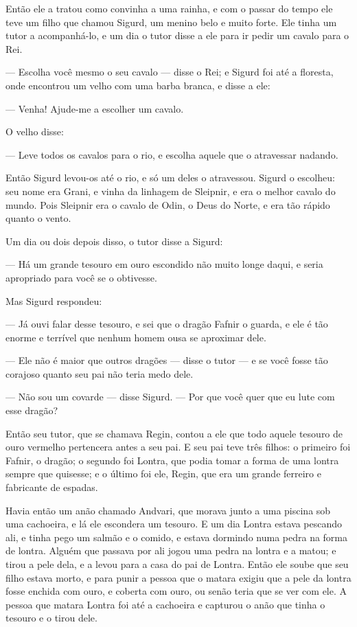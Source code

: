 Então ele a tratou como convinha a uma rainha, e com o passar do tempo
ele teve um filho que chamou Sigurd, um menino belo e muito forte.
Ele tinha um tutor a acompanhá-lo, e um dia o tutor disse a ele para
ir pedir um cavalo para o Rei. 

— Escolha você mesmo o seu cavalo — disse o Rei; e Sigurd foi até a
floresta, onde encontrou um velho com uma barba branca, e disse a
ele:

— Venha! Ajude-me a escolher um cavalo.

O velho disse:

— Leve todos os cavalos para o rio, e escolha aquele que o atravessar
nadando. 

Então Sigurd levou-os até o rio, e só um deles o atravessou. Sigurd o
escolheu: seu nome era Grani, e vinha da linhagem de Sleipnir, e era
o melhor cavalo do mundo. Pois Sleipnir era o cavalo de Odin, o Deus
do Norte, e era tão rápido quanto o vento. 

Um dia ou dois depois disso, o tutor disse a Sigurd:

— Há um grande tesouro em ouro escondido não muito longe daqui, e
seria apropriado para você se o obtivesse. 

Mas Sigurd respondeu:

— Já ouvi falar desse tesouro, e sei que o dragão Fafnir o guarda, e
ele é tão enorme e terrível que nenhum homem ousa se aproximar dele.

— Ele não é maior que outros dragões — disse o tutor — e se você fosse
tão corajoso quanto seu pai não teria medo dele. 

— Não sou um covarde — disse Sigurd. — Por que você quer que eu lute
com esse dragão? 

Então seu tutor, que se chamava Regin, contou a ele que todo aquele
tesouro de ouro vermelho pertencera antes a seu pai. E seu pai teve
três filhos: o primeiro foi Fafnir, o dragão; o segundo foi Lontra,
que podia tomar a forma de uma lontra sempre que quisesse; e o último
foi ele, Regin, que era um grande ferreiro e fabricante de espadas. 

Havia então um anão chamado Andvari, que morava junto a uma piscina
sob uma cachoeira, e lá ele escondera um tesouro. E um dia Lontra
estava pescando ali, e tinha pego um salmão e o comido, e estava
dormindo numa pedra na forma de lontra. Alguém que passava por ali
jogou uma pedra na lontra e a matou; e tirou a pele dela, e a levou
para a casa do pai de Lontra. Então ele soube que seu filho estava
morto, e para punir a pessoa que o matara exigiu que a pele da lontra
fosse enchida com ouro, e coberta com ouro, ou senão teria que se ver
com ele. A pessoa que matara Lontra foi até a cachoeira e capturou o
anão que tinha o tesouro e o tirou dele. 

